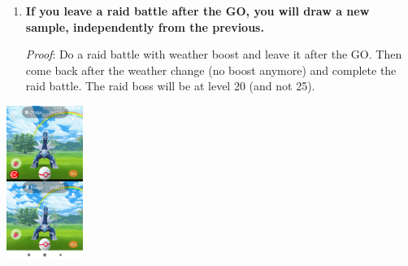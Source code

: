 \documentclass[8pt,aspectratio=169,compress]{beamer}
\begin{document}
\begin{frame}
\begin{block}{}
\begin{tiny}
{\begin{enumerate}
  \item \textbf{If you leave a raid battle after the GO, you will draw a new sample, independently from the previous.}

\emph{Proof}: Do a raid battle with weather boost and leave it after the GO. Then come back after the weather change (no boost anymore) and complete the raid battle. The raid boss will be at level 20 (and not 25). 
\end{enumerate}
}
\parbox{0.02\linewidth}{\quad}
\parbox{0.2\linewidth}{
\begin{center}
\includegraphics[width=2.5cm]{54435651_723596804707123_4963745028846387200_n.png}
\end{center}
}


\end{tiny}
\end{block}
\end{frame}
\end{document}
